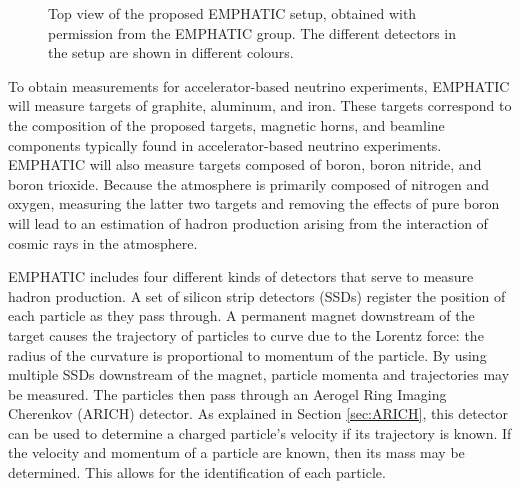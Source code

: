 \begin{figure}[] 
\centering
{}
\caption[Top view of the proposed EMPHATIC setup]{Top view of the proposed EMPHATIC setup, obtained with permission from the EMPHATIC group. The different detectors in the setup are shown in different colours.}
\label{fig:EMPHATIC} 
\end{figure}

To obtain measurements for accelerator-based neutrino experiments, \ac{EMPHATIC} will measure targets of graphite, aluminum, and iron.
These targets correspond to the composition of the proposed targets, magnetic horns, and beamline components typically found in accelerator-based neutrino experiments.
\ac{EMPHATIC} will also measure targets composed of boron, boron nitride, and boron trioxide.
Because the atmosphere is primarily composed of nitrogen and oxygen, measuring the latter two targets and removing the effects of pure boron will lead to an estimation of hadron production arising from the interaction of cosmic rays in the atmosphere. 

\ac{EMPHATIC} includes four different kinds of detectors that serve to measure hadron production.
A set of silicon strip detectors (SSDs) register the position of each particle as they pass through.
A permanent magnet downstream of the target causes the trajectory of particles to curve due to the Lorentz force: the radius of the curvature is proportional to momentum of the particle.
By using multiple SSDs downstream of the magnet, particle momenta and trajectories may be measured.
The particles then pass through an Aerogel Ring Imaging Cherenkov (ARICH) detector.
As explained in Section \ref{sec:ARICH}, this detector can be used to determine a charged particle's velocity if its trajectory is known. 
If the velocity and momentum of a particle are known, then its mass may be determined.
This allows for the identification of each particle. 

